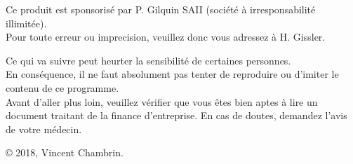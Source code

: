 


\cleardoublepage

\thispagestyle{empty}

\vspace*{\fill}


\begin{center}
Ce produit est sponsorisé par P.\/ Gilquin SAII (société à irresponsabilité illimitée). \\
Pour toute erreur ou imprecision, veuillez donc vous adressez à H.\/ Gissler.
\end{center}


\vspace*{\fill}

\noindent
Ce qui va suivre peut heurter la sensibilité de certaines personnes. 
\\
En conséquence, il ne faut absolument pas tenter de reproduire ou d'imiter le contenu  
de ce programme. \\
Avant d'aller plus loin, veuillez vérifier que vous êtes bien aptes à lire 
un document traitant de la finance d'entreprise. 
En cas de doutes, demandez l'avis de votre médecin.

\vspace{2em}

\begin{center}
© 2018, Vincent Chambrin. 
\end{center}

\newpage



\newpage
\let\oldleftmark=\leftmark
\renewcommand{\leftmark}{Table des matières}

\setcounter{tocdepth}{4}

\pagebreak
\let\leftmark=\oldleftmark